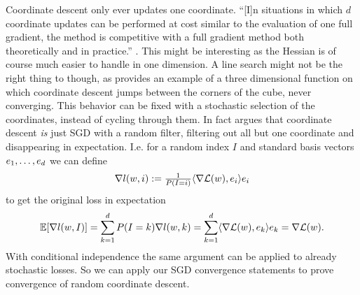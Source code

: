Coordinate descent only ever updates one coordinate. ``[I]n situations in which
\(d\) coordinate updates can be performed at cost similar to the evaluation of
one full gradient, the method is competitive with a full gradient method both
theoretically and in practice.'' \parencite[7.3, p.
72]{bottouOptimizationMethodsLargeScale2018}. This might be interesting as the
Hessian is of course much easier to handle in one dimension. A line search might
not be the right thing to though, as
\textcite{powellSearchDirectionsMinimization1973} provides an example of a three
dimensional function on which coordinate descent jumps between the
corners of the cube, never converging. This behavior can be fixed
with a stochastic selection of the coordinates, instead of cycling through them.
In fact \textcite{bubeckConvexOptimizationAlgorithms2015} argues that coordinate
descent \emph{is} just SGD with a random filter, filtering out all
but one coordinate and disappearing in expectation. I.e. for a random index \(I\)
and standard basis vectors \(e_1,\dots,e_d\) we can
define
\begin{align*}
	\nabla l(w, i)
	:= \tfrac1{P(I=i)} \langle \nabla\mathcal{L}(w), e_i \rangle e_i
\end{align*}
to get the original loss in expectation
\begin{align*}
	\mathbb{E}[\nabla l(w,I)] = \sum_{k=1}^d P(I=k) \nabla l(w,k)
	= \sum_{k=1}^d \langle \nabla\mathcal{L}(w), e_k\rangle e_k
	= \nabla\mathcal{L}(w).
\end{align*}
With conditional independence the same argument can be applied to already
stochastic losses. So we can apply our SGD convergence statements to prove
convergence of random coordinate descent.





\endinput
